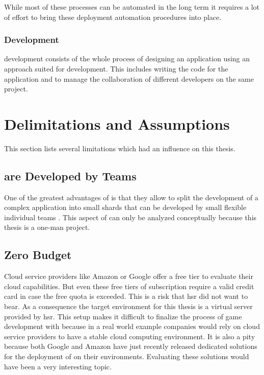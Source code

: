 While most of these processes can be automated in the long term it requires a
lot of effort to bring these deployment automation procedures into place.

\subsubsection{\msuc{} Development}

\msuc{} development consists of the whole process of designing an application
using an approach suited for \ms{} development. This includes writing the code
for the application and to manage the collaboration of different developers on
the same project.

\section{Delimitations and Assumptions}

This section lists several limitations which had an influence on this
thesis.

\subsection{\mssuc{} are Developed by Teams}
One of the greatest advantages of \mss{} is that they allow to split the
development of a complex application into small shards that can be developed by
small flexible individual teams \cite{anderson2017teams}. This aspect of \mss{}
can only be analyzed conceptually because this thesis is a one-man project.

\subsection{Zero Budget}
\label{sub:zero_buget}
Cloud service providers like Amazon or Google offer a free tier to evaluate
their cloud capabilities. But even these free tiers of subscription require a
valid credit card in case the free quota is exceeded. This is a risk that
\gls{hsr} did not want to bear. As a consequence the target environment for this
thesis is a virtual server provided by \gls{hsr}. This setup makes it difficult
to finalize the process of game development with \mss{} because in a real world
example companies would rely on cloud service providers to have a stable cloud
computing environment. It is also a pity because both Google and Amazon have
just recently released dedicated solutions for the deployment of \ogs{} on their
environments. Evaluating these solutions would have been a very interesting
topic.

